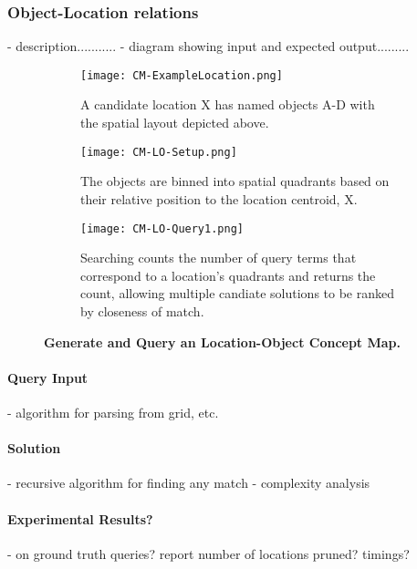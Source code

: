 \subsubsection{Object-Location relations}
- description...........
- diagram showing input and expected output.........

\begin{figure*}[h]
    \centering
    
    \begin{subfigure}[t]{.3\textwidth}
        \texttt{[image: CM-ExampleLocation.png]}
        \caption{\small A candidate location X has named objects A-D with the spatial layout depicted above.} 
        \label{fig:CM-LO-Example}
    \end{subfigure}
    \hfill
    \begin{subfigure}[t]{.3\textwidth}
        \texttt{[image: CM-LO-Setup.png]}
        \caption{\small The objects are binned into spatial quadrants based on their relative position to the location centroid, X.} 
        \label{fig:CM-LO-Setup}
    \end{subfigure}
    \hfill
        \begin{subfigure}[t]{.3\textwidth}
        \texttt{[image: CM-LO-Query1.png]}
        \caption{\small Searching counts the number of query terms that correspond to a location's quadrants and returns the count, allowing multiple candiate solutions to be ranked by closeness of match.}
        \label{fig:CM-LO-Query}
    \hfill
    \end{subfigure}
    \caption{\textbf{Generate and Query an Location-Object Concept Map.}}\label{figure:ConceptMap-LO} 
\end{figure*}




\paragraph{Query Input}
- algorithm for parsing from grid, etc.

\paragraph{Solution}
- recursive algorithm for finding any match
- complexity analysis

\paragraph{Experimental Results?}
- on ground truth queries? report number of locations pruned? timings?


